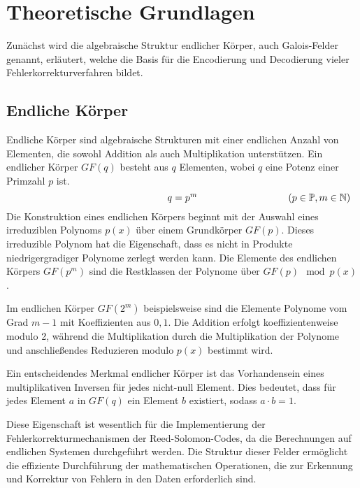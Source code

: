 \chapter{Theoretische Grundlagen}\label{ch:foundation}

Zunächst wird die algebraische Struktur endlicher Körper, auch Galois-Felder genannt, erläutert, welche die Basis für die Encodierung und Decodierung vieler Fehlerkorrekturverfahren bildet.

\section{Endliche Körper}\label{sec:galois}

Endliche Körper sind algebraische Strukturen mit einer endlichen Anzahl von Elementen, die sowohl Addition als auch Multiplikation unterstützen. 
Ein endlicher Körper \(GF(q)\) besteht aus \(q\) Elementen, wobei \(q\) eine Potenz einer Primzahl \(p\) ist.
\[
\makebox[\linewidth]{%
	\hfill
	$q=p^{m}$\hfill
	\llap{($p\in\mathbb{P}, m\in\mathbb{N}$)}%
}
\]
Die Konstruktion eines endlichen Körpers beginnt mit der Auswahl eines irreduziblen Polynoms $p(x)$ über einem Grundkörper $GF(p)$. 
Dieses irreduzible Polynom hat die Eigenschaft, dass es nicht in Produkte niedrigergradiger Polynome zerlegt werden kann. 
Die Elemente des endlichen Körpers $GF(p^{m})$ sind die Restklassen der Polynome über $GF(p)\mod p(x)$.

Im endlichen Körper $GF(2^{m})$ beispielsweise sind die Elemente Polynome vom Grad $m-1$ mit Koeffizienten aus ${0,1}$.
Die Addition erfolgt koeffizientenweise modulo 2, während die Multiplikation durch die Multiplikation der Polynome und anschließendes Reduzieren modulo $p(x)$ bestimmt wird.

Ein entscheidendes Merkmal endlicher Körper ist das Vorhandensein eines multiplikativen Inversen für jedes nicht-null Element. 
Dies bedeutet, dass für jedes Element $a$ in $GF(q)$ ein Element $b$ existiert, sodass $a\cdot b=1$. 

Diese Eigenschaft ist wesentlich für die Implementierung der Fehlerkorrekturmechanismen der Reed-Solomon-Codes, da die Berechnungen auf endlichen Systemen durchgeführt werden.
Die Struktur dieser Felder ermöglicht die effiziente Durchführung der mathematischen Operationen, die zur Erkennung und Korrektur von Fehlern in den Daten erforderlich sind. 
